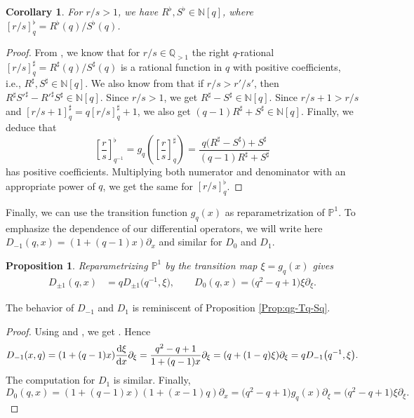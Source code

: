 \documentclass[pdftex]{sigma}
\numberwithin{equation}{section}
\newtheorem{Corollary}[Theorem]{Corollary}
\newtheorem{Proposition}[Theorem]{Proposition}
 { \theoremstyle{definition}
\newtheorem{Definition}[Theorem]{Definition}
\newtheorem{Note}[Theorem]{Note}
\newtheorem{Example}[Theorem]{Example}
\newtheorem{Remark}[Theorem]{Remark} }
\newcommand*{\Q}{\mathbb{Q}}
\newcommand*{\N}{\mathbb{N}}
\begin{document}
\begin{Corollary}
For $r/s>1$, we have $R^\flat, S^\flat\in\N[q]$, where $[r/s]_q^\flat=R^\flat(q)/S^\flat(q)$.
\end{Corollary}
\begin{proof}
From \cite[Proposition 1.3]{morier2020continued}, we know that for $r/s\in\Q_{>1}$ the right $q$-rational $[r/s]_q^\sharp=R^\sharp(q)/S^\sharp(q)$ is a rational function in $q$ with positive coefficients, i.e., $R^\sharp, S^\sharp\in \mathbb{N}[q]$. We also know from \cite[Theorem 2]{morier2020continued} that if $r/s> r'/s'$, then $R^\sharp S'^\sharp-R'^\sharp S^\sharp \in \N[q]$. Since ${r/s>1}$, we get ${R^\sharp-S^\sharp\in\N[q]}$. Since $r/s+1>r/s$ and $[r/s+1]_q^\sharp=q[r/s]_q^\sharp+1$, we also get ${(q-1)R^\sharp+S^\sharp \in\N[q]}$. Finally, we deduce that
\[
\left[\frac{r}{s}\right]_{q^{-1}}^\flat = g_q\left(\left[\frac{r}{s}\right]_q^\sharp\right)=\frac{q\big(R^\sharp-S^\sharp\big)+S^\sharp}{(q-1)R^\sharp+S^\sharp}
\]
has positive coefficients. Multiplying both numerator and denominator with an appropriate power of $q$, we get the same for $[r/s]^\flat_q$.
\end{proof}


Finally, we can use the transition function $g_q(x)$ as reparametrization of $\mathbb{P}^1$. To emphasize the dependence of our differential operators, we will write here $D_{-1}(q,x)=(1+(q-1)x)\partial_x$ and similar for $D_0$ and $D_{1}$.
\begin{Proposition}
Reparametrizing $\mathbb{P}^1$ by the transition map $\xi=g_q(x)$ gives
\begin{align*}
D_{\pm 1}(q,x) &= q D_{\pm 1}\big(q^{-1},\xi\big), \qquad
D_0(q,x) = \big(q^2-q+1\big)\xi \partial_\xi.
\end{align*}
\end{Proposition}
The behavior of $D_{-1}$ and $D_1$ is reminiscent of Proposition \ref{Prop:qg-Tq-Sq}.
\begin{proof}
Using  and , we get . Hence
\[
D_{-1}(x,q)=(1+(q-1)x)\frac{{\rm d}\xi}{{\rm d}x}\partial_\xi = \frac{q^2-q+1}{1+(q-1)x}\partial_\xi = (q+(1-q)\xi)\partial_\xi = qD_{-1}\big(q^{-1},\xi\big).
\]
The computation for $D_{1}$ is similar. Finally,
\[
D_0(q,x)=(1+(q-1)x)(1+(x-1)q)\partial_x = \big(q^2-q+1\big)g_q(x)\partial_\xi = \big(q^2-q+1\big)\xi\partial_\xi.\tag*{\qed}
\]\renewcommand{\qed}{}
\end{proof}
\end{document}

